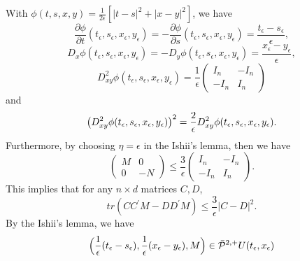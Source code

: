 \documentclass[12pt,a4paper]{ctexart}
\begin{document}
With $\phi (t,s,x,y) = \frac{1}{2 \epsilon} [|t-s|^{2} + |x-y|^{2}]$, we have
\begin{equation*}
    \frac{\partial \phi}{\partial t} (t_\epsilon, s_\epsilon, x_\epsilon, y_\epsilon) = - \frac{\partial \phi}{\partial s} (t_\epsilon, s_\epsilon, x_\epsilon, y_\epsilon) = \frac{t_\epsilon - s_\epsilon}{\epsilon},
\end{equation*}
\begin{equation*}
    D_{x} \phi (t_\epsilon, s_\epsilon, x_\epsilon, y_\epsilon) = - D_{y} \phi (t_\epsilon, s_\epsilon, x_\epsilon, y_\epsilon) = \frac{x_\epsilon - y_\epsilon}{\epsilon},
\end{equation*}
\begin{equation*}
    D_{xy}^{2} \phi (t_\epsilon, s_\epsilon, x_\epsilon, y_\epsilon) = \frac{1}{\epsilon} 
  \left(   \begin{array}{cc}
    I_{n} &  - I_{n} \\
    -I_{n} & I_{n}
\end{array}   \right)
\end{equation*}
and
\begin{equation*}
    \big{(} D_{xy}^{2} \phi (t_\epsilon, s_\epsilon, x_\epsilon, y_\epsilon) \big{)}^{2} = \frac{2}{\epsilon} D_{xy}^{2} \phi (t_\epsilon, s_\epsilon, x_\epsilon, y_\epsilon).
\end{equation*}
Furthermore, by choosing $\eta = \epsilon$ in the Ishii's lemma, then we have 
\begin{equation*}
  \left(   \begin{array}{cc}
    M &  0 \\
    0 & - N
\end{array}   \right) \leq  \frac{3}{\epsilon}
\left(   \begin{array}{cc}
    I_{n} &  - I_{n} \\
    -I_{n} & I_{n}
\end{array}   \right).
\end{equation*}
This implies that for any $n \times d$ matrices $C, D$, 
\begin{equation} \label{trace}
    tr(C C^{'} M - D D^{'} M) \leq \frac{3}{\epsilon} |C - D|^{2}.
\end{equation}
By the Ishii's lemma, we have
\begin{equation*}
    \Big{(} \frac{1}{\epsilon}(t_\epsilon - s_\epsilon), \frac{1}{\epsilon} (x_{\epsilon} - y_{\epsilon}), M \Big{)} \in \bar{\mathcal{P}}^{2, +} U(t_\epsilon, x_\epsilon)
\end{equation*}
\end{document}
